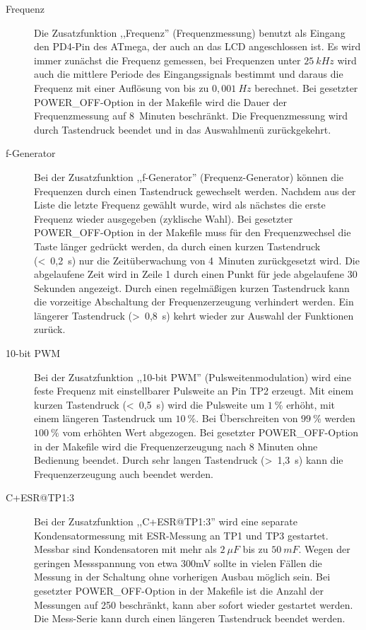 \begin{description}
 \item[Frequenz]
Die Zusatzfunktion ,,Frequenz'' (Frequenzmessung) benutzt als Eingang den PD4-Pin des ATmega, der auch an das LCD angeschlossen ist.
Es wird immer zunächst die Frequenz gemessen, bei Frequenzen unter \(25~kHz\) wird auch die mittlere Periode des Eingangssignals
bestimmt und daraus die Frequenz mit einer Auflösung von bis zu \(0,001~Hz\) berechnet.
Bei gesetzter POWER\_OFF-Option in der Makefile wird die Dauer der Frequenzmessung auf 8~Minuten beschränkt.
Die Frequenzmessung wird durch Tastendruck beendet und in das Auswahlmenü zurückgekehrt.\\

 \item[f-Generator]
Bei der Zusatzfunktion ,,f-Generator'' (Frequenz-Generator) können die Frequenzen durch einen Tastendruck 
 gewechselt werden.
Nachdem aus der Liste die letzte Frequenz gewählt wurde, wird als nächstes die erste Frequenz
 wieder ausgegeben (zyklische Wahl).
Bei gesetzter POWER\_OFF-Option in der Makefile muss für den Frequenzwechsel die Taste länger gedrückt werden, da
durch einen kurzen Tastendruck (\textless~0,2~s) nur die Zeitüberwachung von 4~Minuten zurückgesetzt wird.
Die abgelaufene Zeit wird in Zeile 1 durch einen Punkt für jede abgelaufene 30 Sekunden angezeigt.
Durch einen regelmäßigen kurzen Tastendruck kann die vorzeitige Abschaltung der Frequenzerzeugung verhindert werden.
Ein längerer Tastendruck (\textgreater~0,8~s) kehrt wieder zur Auswahl der Funktionen zurück.\\

 \item[10-bit PWM]
Bei der Zusatzfunktion ,,10-bit PWM'' (Pulsweitenmodulation) wird eine feste Frequenz mit einstellbarer Pulsweite an Pin TP2 erzeugt.
Mit einem kurzen Tastendruck (\textless~0,5~s) wird die Pulsweite um \(1~\%\) erhöht, mit einem längeren Tastendruck um \(10~\%\).
Bei Überschreiten von \(99~\%\) werden \(100~\%\) vom erhöhten Wert abgezogen.
Bei gesetzter POWER\_OFF-Option in der Makefile wird die Frequenzerzeugung nach 8 Minuten ohne Bedienung beendet.
Durch sehr langen Tastendruck (\textgreater~1,3~s) kann die Frequenzerzeugung auch beendet werden.\\

 \item[C+ESR@TP1:3]
Bei der Zusatzfunktion ,,C+ESR@TP1:3'' wird eine separate Kondensatormessung mit ESR-Messung an TP1 und TP3 gestartet.
Messbar sind Kondensatoren mit mehr als \(2~\mu F\) bis zu \(50~mF\). Wegen der geringen Messspannung von etwa 300mV sollte
in vielen Fällen die Messung in der Schaltung ohne vorherigen Ausbau möglich sein.
Bei gesetzter POWER\_OFF-Option in der Makefile ist die Anzahl der Messungen auf 250 beschränkt,
kann aber sofort wieder gestartet werden.
Die Mess-Serie kann durch einen längeren Tastendruck beendet werden.\\


\end{description}
